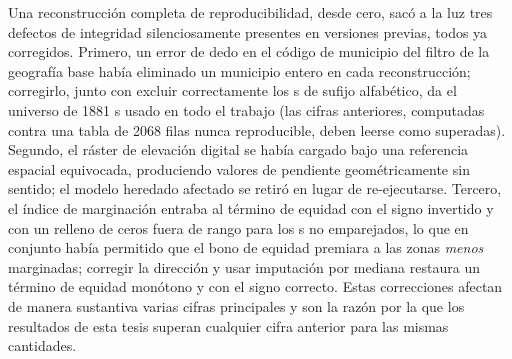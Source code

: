 Una reconstrucción completa de reproducibilidad, desde cero, sacó a la luz tres defectos de
integridad silenciosamente presentes en versiones previas, todos ya corregidos. Primero, un
error de dedo en el código de municipio del filtro de la geografía base había eliminado un
municipio entero en cada reconstrucción; corregirlo, junto con excluir correctamente los
\ageb{}s de sufijo alfabético, da el universo de \num{1881} \ageb{}s usado en todo el
trabajo (las cifras anteriores, computadas contra una tabla de \num{2068} filas nunca
reproducible, deben leerse como superadas). Segundo, el ráster de elevación digital se había
cargado bajo una referencia espacial equivocada, produciendo valores de pendiente
geométricamente sin sentido; el modelo heredado afectado se retiró en lugar de re-ejecutarse.
Tercero, el índice de marginación entraba al término de equidad con el signo invertido y con
un relleno de ceros fuera de rango para los \ageb{}s no emparejados, lo que en conjunto había
permitido que el bono de equidad premiara a las zonas \emph{menos} marginadas; corregir la
dirección y usar imputación por mediana restaura un término de equidad monótono y con el
signo correcto. Estas correcciones afectan de manera sustantiva varias cifras principales y
son la razón por la que los resultados de esta tesis superan cualquier cifra anterior para
las mismas cantidades.
